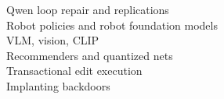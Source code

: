 Qwen loop repair and replications \citep{ax2611_09382,ax2611_20953,zen24416417}\\ Robot policies and robot foundation models \citep{ax2611_09376,ax2611_11894,ax2611_31715}\\ VLM, vision, CLIP \citep{ax2611_23615,ax2611_28781,ax2611_25476,ax2611_25257,ax2611_28105}\\ Recommenders and quantized nets \citep{ax2611_29613,ax2611_33031}\\ Transactional edit execution \citep{ax2611_13232}\\ Implanting backdoors \citep{ax2611_17395,ax2611_27920,ax2611_27425}
